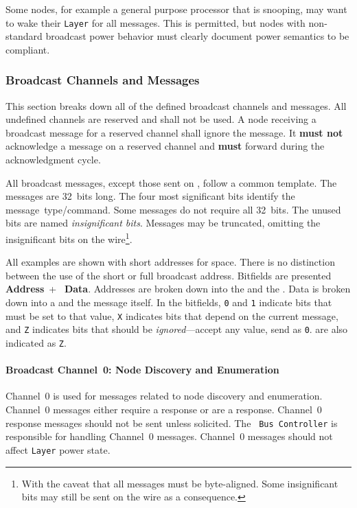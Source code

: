 Some nodes, for example a general purpose processor that is snooping, may want
to wake their {\tt Layer} for all messages. This is permitted, but nodes with
non-standard broadcast power behavior must clearly document power semantics to
be \bus compliant.

\subsubsection{Broadcast Channels and Messages}
This section breaks down all of the defined \bus broadcast channels and messages.
All undefined channels are reserved and shall not be used. A node receiving a
broadcast message for a reserved channel shall ignore the message. It {\bf
must not} acknowledge a message on a reserved channel and {\bf must} forward
during the acknowledgment cycle.

All \bus broadcast messages, except those sent on ,
follow a common template. The messages are 32~bits long. The four most
significant bits identify the message~type/command. Some messages do not
require all 32~bits. The unused bits are named {\em insignificant bits}.
Messages may be truncated, omitting the insignificant bits on the
wire\footnote{
  With the caveat that all \bus messages must be byte-aligned. Some
insignificant bits may still be sent on the wire as a consequence.}.

All examples are shown with short addresses for space. There is no distinction
between the use of the short or full broadcast address.
Bitfields are presented \textbf{\color{blue} Address}~+~\textbf{\color{OliveGreen} Data}.
Addresses are broken down into the  and the
. Data is broken down into a
 and the message itself.
%
In the bitfields,
{\tt 0} and {\tt 1} indicate bits that must be set to that value, {\tt X}
indicates bits that depend on the current message, and {\tt Z} indicates bits
that should be {\em ignored}---accept any value, send as {\tt 0}.
 are also indicated as {\tt Z}.

\paragraph{Broadcast Channel~0: Node Discovery and Enumeration}
\label{sec:channel-0}

Channel~0 is used for messages related to node discovery and enumeration.
Channel~0 messages either require a response or are a response. Channel~0
response messages should not be sent unless solicited. The {\tt
Bus~Controller} is responsible for handling Channel~0 messages. Channel~0
messages should not affect {\tt Layer} power state.

